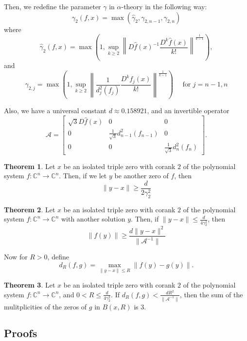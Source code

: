 \documentclass[12pt,oneside,reqno]{amsart}
\theoremstyle{definition}
\newtheorem{thm}{Theorem}
\begin{document}
Then, we redefine the parameter $\gamma$ in $\alpha$-theory in the following way:
$$\gamma_2(f,x)=\max(\hat{\gamma}_2,\gamma_{2,n-1},\gamma_{2,n})$$
where
\[\hat{\gamma}_2(f,x)=\max\left(1,\sup\limits_{k\geq 2}\left\|D\hat{f}(x)^{-1}\frac{D^k\hat{f}(x)}{k!}\right\|^{\frac{1}{k-1}}\right),\]
and
\[\gamma_{2,j}=\max\left(1,\sup\limits_{k\geq 2}\left\|\frac{1}{d_j^2(f_j)}\frac{D^k f_j(x)}{k!}\right\|^{\frac{1}{k-1}}\right)\quad \text{ for } j=n-1,n\]


Also, we have a universal constant $d\approx0.158921$, and an invertible operator 
\[\mathcal{A}=\begin{bmatrix}
\sqrt{3}D\hat{f}(x) & 0 & 0\\
0 & \frac{1}{\sqrt{3}}d_{n-1}^2(f_{n-1}) & 0 \\
0 & 0 & \frac{1}{\sqrt{3}}d_{n}^2(f_{n})
\end{bmatrix}.\]

\begin{thm}\label{thm:tripleRootSeparationBound}
	Let $x$ be an isolated triple zero with corank $2$ of the polynomial system $f:\mathbb{C}^n\rightarrow\mathbb{C}^n$. Then, if we let $y$ be another zero of $f$, then
	\[\|y-x\|\geq \frac{d}{2\gamma_2^2}\]
\end{thm}

\begin{thm}\label{thm:lowerboundfy}
	Let $x$ be an isolated triple zero with corank $2$ of the polynomial system $f:\mathbb{C}^n\rightarrow \mathbb{C}^n$ with another solution $y$. Then, if $\|y-x\|\leq \frac{d}{4\gamma_2^2}$, then
	\[\left\|f(y)\right\|\geq \frac{d\|y-x\|^2}{\|\mathcal{A}^{-1}\|}\]
\end{thm}


Now for $R>0$, define
\begin{equation*}
d_R(f,g)=\max\limits_{\|y-x\|\leq R}\|f(y)-g(y)\|.
\end{equation*}
\begin{thm}\label{thm:multiplicityOfDiffSystem}
	Let $x$ be an isolated triple zero with corank $2$ of the polynomial system $f:\mathbb{C}^n\rightarrow\mathbb{C}^n$, and $0<R\leq \frac{d}{4\gamma_2^2}$. If $d_R(f,g)<\frac{dR^2}{\|\mathcal{A}^{-1}\|}$, then the sum of the mulitplicities of the zeros of $g$ in $B(x,R)$ is $3$.
\end{thm}

\subsection{Proofs}
\end{document}
